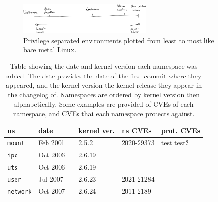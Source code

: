 \documentclass[a4paper,12pt,twoside,openright]{report}
\begin{document}
\begin{figure}[h]
    \centering
    \includegraphics[width=0.6\textwidth]{figures/least-most-linux.png}
    \caption{Privilege separated environments plotted from least to most like bare metal Linux.}
    \label{fig:least-to-most-linux}
\end{figure}


\begin{table}
    \caption{Table showing the date and kernel version each namespace was added. The date provides the date of the first commit where they appeared, and the kernel version the kernel release they appear in the changelog of. Namespaces are ordered by kernel version then alphabetically. Some examples are provided of CVEs of each namespace, and CVEs that each namespace protects against.}

    \begin{center}
    \begin{tabular}{l|lr|lr|l|l}
        ns & \multicolumn{2}{l}{date} & \multicolumn{2}{|l|}{kernel ver.} & ns CVEs & prot. CVEs \\ \hline

        \texttt{mount}
            & Feb 2001 & \citep{viro_patchcft_2001}
            & 2.5.2 & \citep{torvalds_linux_2002}
            & 2020-29373
            & test \newline test2 \\

        \texttt{ipc}
            & Oct 2006 & \citep{korotaev_patch_2006}
            & 2.6.19 & \citep{noauthor_linux_2006}
            &
            & \\

        \texttt{uts}
            & Oct 2006 & \citep{hallyn_patch_2006}
            & 2.6.19 & \citep{noauthor_linux_2006}
            &
            & \\

        \texttt{user}
            & Jul 2007 & \citep{le_goater_user_2007}
            & 2.6.23 & \citep{noauthor_linux_2007}
            & 2021-21284
            & \\

        \texttt{network}
            & Oct 2007 & \citep{biederman_net_2007}
            & 2.6.24 & \citep{noauthor_linux_2008}
            & 2011-2189
            & \\


\end{tabular}
\end{center}
\end{table}
\end{document}
